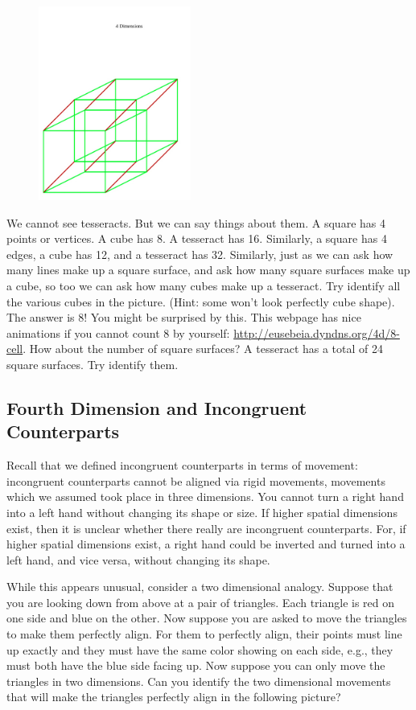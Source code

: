 \documentclass[oneside]{article}
\begin{document}
\begin{figure}[h!]
\centering
\includegraphics[width=50mm]{four.jpg}
\end{figure}

We cannot see tesseracts. But we can say things about them. A square has 4 points or vertices. A cube has 8. A tesseract has 16. Similarly, a square has 4 edges, a cube has 12, and a tesseract has 32.  Similarly, just as we can ask how many lines make up a square surface, and ask how many square surfaces make up a cube, so too we can ask how many cubes make up a tesseract. Try identify all the various cubes in the picture. (Hint: some won't look perfectly cube shape). The answer is 8! You might be surprised by this. This webpage has nice animations if you cannot count 8 by yourself: \url{http://eusebeia.dyndns.org/4d/8-cell}. How about the number of square surfaces? A tesseract has a total of 24 square surfaces. Try identify them.



\subsection*{Fourth Dimension and Incongruent Counterparts}

Recall that we defined incongruent counterparts in terms of movement: incongruent counterparts cannot be aligned via rigid movements, movements which we assumed took place in three dimensions. You cannot turn a right hand into a left hand without changing its shape or size. If higher spatial dimensions exist, then it is unclear whether there really are incongruent counterparts. For, if higher spatial dimensions exist, a right hand could be inverted and turned into a left hand, and vice versa, without changing its shape.

While this appears unusual, consider a two dimensional analogy. Suppose that you are looking down from above at a pair of triangles. Each triangle is red on one side and blue on the other. Now suppose you are asked to move the triangles to make them perfectly align. For them to perfectly align, their points must line up exactly and they must have the same color showing on each side, e.g., they must both have the blue side facing up. Now suppose you can only move the triangles in two dimensions. Can you identify the two dimensional movements that will make the triangles perfectly align in the following picture? 
\end{document}
